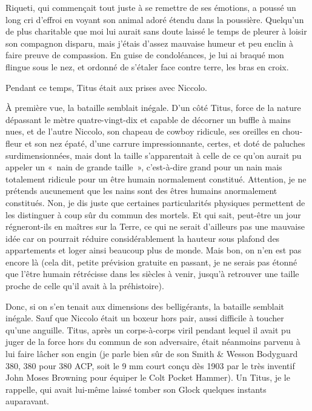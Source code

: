 Riqueti, qui commençait tout juste à se remettre de ses émotions, a poussé un long cri d’effroi en voyant son animal adoré étendu dans la poussière. Quelqu’un de plus charitable que moi lui aurait sans doute laissé le temps de pleurer à loisir son compagnon disparu, mais j’étais d’assez mauvaise humeur et peu enclin à faire preuve de compassion. En guise de condoléances, je lui ai braqué mon flingue sous le nez, et ordonné de s’étaler face contre terre, les bras en croix.

Pendant ce temps, Titus était aux prises avec Niccolo.

À première vue, la bataille semblait inégale. D’un côté Titus, force de la nature dépassant le mètre quatre-vingt-dix et capable de décorner un buffle à mains nues, et de l’autre Niccolo, son chapeau de cowboy ridicule, ses oreilles en chou-fleur et son nez épaté, d’une carrure impressionnante, certes, et doté de paluches surdimensionnées, mais dont la taille s’apparentait à celle de ce qu’on aurait pu appeler un «~nain de grande taille~», c’est-à-dire grand pour un nain mais totalement ridicule pour un être humain normalement constitué. Attention, je ne prétends aucunement que les nains sont des êtres humains anormalement constitués. Non, je dis juste que certaines particularités physiques permettent de les distinguer à coup sûr du commun des mortels. Et qui sait, peut-être un jour régneront-ils en maîtres sur la Terre, ce qui ne serait d’ailleurs pas une mauvaise idée car on pourrait réduire considérablement la hauteur sous plafond des appartements et loger ainsi beaucoup plus de monde. Mais bon, on n’en est pas encore là (cela dit, petite prévision gratuite en passant, je ne serais pas étonné que l’être humain rétrécisse dans les siècles à venir, jusqu’à retrouver une taille proche de celle qu’il avait à la préhistoire).

Donc, si on s’en tenait aux dimensions des belligérants, la bataille semblait inégale. Sauf que Niccolo était un boxeur hors pair, aussi difficile à toucher qu’une anguille. Titus, après un corps-à-corps viril pendant lequel il avait pu juger de la force hors du commun de son adversaire, était néanmoins parvenu à lui faire lâcher son engin (je parle bien sûr de son Smith \& Wesson Bodyguard 380, 380 pour 380 ACP, soit le 9 mm court conçu dès 1903 par le très inventif John Moses Browning pour équiper le Colt Pocket Hammer). Un Titus, je le rappelle, qui avait lui-même laissé tomber son Glock quelques instants auparavant.

